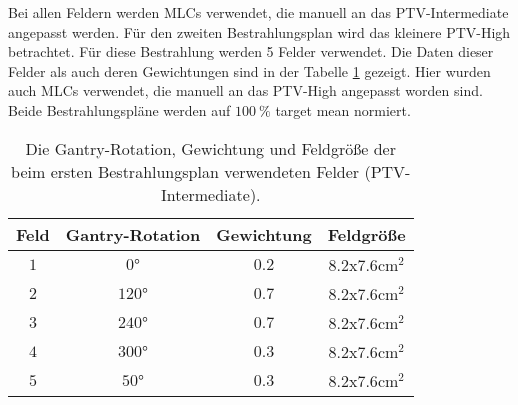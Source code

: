 Bei allen Feldern werden MLCs verwendet, die manuell an das PTV-Intermediate angepasst werden. Für den zweiten Bestrahlungsplan wird das kleinere PTV-High betrachtet. Für diese Bestrahlung werden 5 Felder verwendet. Die Daten dieser Felder als auch deren Gewichtungen sind in der Tabelle \ref{tab:Felder2} gezeigt. Hier wurden auch MLCs verwendet, die manuell an das PTV-High angepasst worden sind. Beide Bestrahlungspläne werden auf $\SI{100}{\percent}$ target mean normiert.

\begin{table}
	\centering
	\caption{Die Gantry-Rotation, Gewichtung und Feldgröße der beim ersten Bestrahlungsplan verwendeten Felder (PTV-Intermediate).}
	\label{tab:Felder2}
	\begin{tabular}{c c c c}
		\toprule
		Feld & Gantry-Rotation & Gewichtung & Feldgröße\\
		\midrule
		$1$ & $0°$   & $0.2$ & $\num{8.2}$x$\num{7.6} \si{\centi\meter\squared}$ \\
		$2$ & $120°$  & $0.7$ & $\num{8.2}$x$\num{7.6} \si{\centi\meter\squared}$ \\
		$3$ & $240°$ & $0.7$ & $\num{8.2}$x$\num{7.6} \si{\centi\meter\squared}$ \\
		$4$ & $300°$ & $0.3$ & $\num{8.2}$x$\num{7.6} \si{\centi\meter\squared}$ \\
		$5$ & $50°$ & $0.3$ & $\num{8.2}$x$\num{7.6} \si{\centi\meter\squared}$ \\
		\bottomrule
	\end{tabular}
\end{table}
